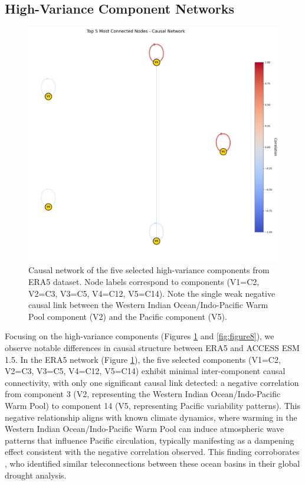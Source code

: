 \documentclass[
]{krantz}
\begin{document}
\subsection{High-Variance Component Networks}\label{high-variance-component-networks}

\begin{figure}

{\centering \includegraphics[width=0.49\linewidth]{work/02-causaldisc/figures/ERA5/era5_causal_net_sel_comp} 

}

\caption{Causal network of the five selected high-variance components from ERA5 dataset. Node labels correspond to components (V1=C2, V2=C3, V3=C5, V4=C12, V5=C14). Note the single weak negative causal link between the Western Indian Ocean/Indo-Pacific Warm Pool component (V2) and the Pacific component (V5).}\label{fig:figure7}
\end{figure}

Focusing on the high-variance components (Figures \ref{fig:figure7} and \ref{fig:figure8}), we observe notable differences in causal structure between ERA5 and ACCESS ESM 1.5. In the ERA5 network (Figure \ref{fig:figure7}), the five selected components (V1=C2, V2=C3, V3=C5, V4=C12, V5=C14) exhibit minimal inter-component causal connectivity, with only one significant causal link detected: a negative correlation from component 3 (V2, representing the Western Indian Ocean/Indo-Pacific Warm Pool) to component 14 (V5, representing Pacific variability patterns). This negative relationship aligns with known climate dynamics, where warming in the Western Indian Ocean/Indo-Pacific Warm Pool can induce atmospheric wave patterns that influence Pacific circulation, typically manifesting as a dampening effect consistent with the negative correlation observed. This finding corroborates \citet{chauhan2024}, who identified similar teleconnections between these ocean basins in their global drought analysis.
\end{document}

